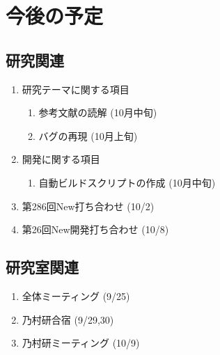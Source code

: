 \documentclass[fleqn, 14pt]{extarticle}
\begin{document}
    \section{今後の予定}
    \label{sec-4}

    \subsection{研究関連}
    \label{sec-4-1}

    \begin{enumerate}

        \item 研究テーマに関する項目
            \hfill
            \begin{enumerate}

                \item 参考文献の読解
                    \hfill
                    (10月中旬)

                \item バグの再現
                    \hfill
                    (10月上旬)

            \end{enumerate}

        \item 開発に関する項目
            \hfill
            \begin{enumerate}

                \item 自動ビルドスクリプトの作成
                    \hfill
                    (10月中旬)

            \end{enumerate}

        \item 第286回New打ち合わせ
            \hfill
            \label{enum-7}
            (10/2)

        \item 第26回New開発打ち合わせ
            \hfill
            \label{enum-7}
            (10/8)

    \end{enumerate}

    \subsection{研究室関連}
    \label{sec-4-2}

    \begin{enumerate}

        \item 全体ミーティング
            \hfill
            \label{enum-18}
            (9/25)

        \item 乃村研合宿
            \hfill
            \label{enum-18}
            (9/29,30)

        \item 乃村研ミーティング
            \hfill
            \label{enum-18}
            (10/9)

    \end{enumerate}
\end{document}
